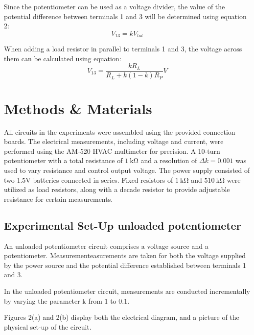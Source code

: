 \documentclass[a4paper]{article}
\newcommand{\unit}[1]{~\mathrm{#1}}
\begin{document}
Since the potentiometer can be used as a voltage divider, the value of the
potential difference between terminals 1 and 3 will be determined using equation 2:
\begin{equation}
    V_{13} = k V_{tot}
\end{equation} 

When adding a load resistor in parallel to terminals 1 and 3, the voltage across
them can be calculated using equation:
\begin{equation}
    V_{13} = \frac{kR_{L}}{R_{L}+k(1-k)R_P} V
\end{equation}
\section{Methods \& Materials}
All circuits in the experiments were assembled using the provided connection boards. 
The electrical measurements, including voltage and current, were performed using the AM-520 
HVAC multimeter for precision. 
A 10-turn potentiometer with a total resistance of $1 \unit{k\Omega}$ and a resolution of $\Delta k = 0.001$ 
was used to vary resistance and control output voltage. 
The power supply consisted of two 1.5V batteries connected in series. 
Fixed resistors of $1 \unit{k\Omega}$  and $510 \unit{k\Omega}$  were utilized as load resistors, 
along with a decade resistor to provide 
adjustable resistance for certain measurements.


\newpage
\subsection{Experimental Set-Up unloaded potentiometer}
An unloaded potentiometer circuit comprises a voltage source and a potentiometer.
Measurementeasurements are taken for both the voltage supplied by the power source
and the potential difference established between terminals 1 and 3. 

In the unloaded potentiometer circuit, measurements are conducted incrementally by varying the parameter 
k from 1 to 0.1. 

Figures 2(a) and 2(b) display both
the electrical diagram, and a picture of the physical set-up of the circuit.
\end{document}
